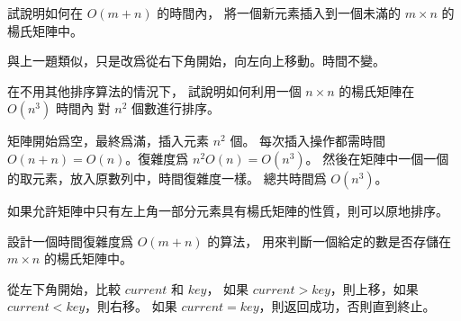 \startigBase[continue]\startitem
試說明如何在 $O(m+n)$ 的時間內，
將一個新元素插入到一個未滿的 $m\times n$ 的楊氏矩陣中。
\stopitem\stopigBase

\startANSWER
與上一題類似，只是改爲從右下角開始，向左向上移動。時間不變。
\stopANSWER

\startigBase[continue]\startitem
在不用其他排序算法的情況下，
試說明如何利用一個 $n\times n$ 的楊氏矩陣在 $O(n^3)$ 時間內
對 $n^2$ 個數進行排序。
\stopitem\stopigBase

\startANSWER
矩陣開始爲空，最終爲滿，插入元素 $n^2$ 個。
每次插入操作都需時間 $O(n+n)=O(n)$。復雜度爲 $n^2 O(n)=O(n^3)$。
然後在矩陣中一個一個的取元素，放入原數列中，時間復雜度一樣。
總共時間爲 $O(n^3)$。

如果允許矩陣中只有左上角一部分元素具有楊氏矩陣的性質，則可以原地排序。
\stopANSWER

\startigBase[continue]\startitem
設計一個時間復雜度爲 $O(m+n)$ 的算法，
用來判斷一個給定的數是否存儲在 $m\times n$ 的楊氏矩陣中。
\stopitem\stopigBase

\startANSWER
從左下角開始，比較 $current$ 和 $key$，
如果 $current > key$，則上移，如果 $current < key$，則右移。
如果 $current = key$，則返回成功，否則直到終止。
\stopANSWER

\stopPROBLEM

\stopsubject
